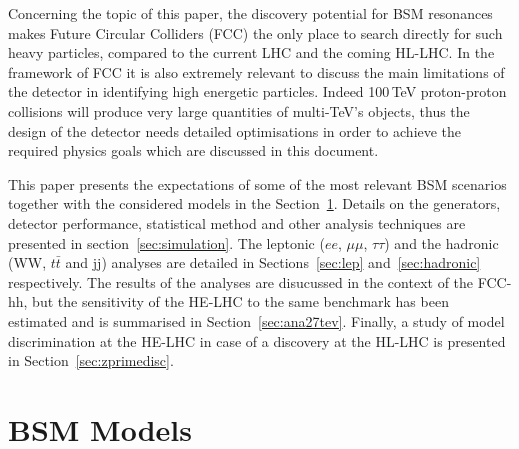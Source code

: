 \documentclass[a4paper,11pt]{article}
\begin{document}
Concerning the topic of this paper, the discovery potential for BSM resonances %
makes Future Circular Colliders (FCC) the only place to search directly for such heavy particles, compared to the current LHC and the coming HL-LHC.
In the framework of FCC it is also extremely relevant to discuss the main limitations of the detector in identifying high energetic particles. Indeed 100\,TeV proton-proton collisions will produce very large quantities of multi-TeV's objects, thus the design of the detector needs detailed optimisations in order to achieve the required physics goals which are discussed in this document.

This paper presents the expectations of some of the most relevant BSM scenarios together with the considered models in the Section~\ref{sec:bsmmodels}. Details on the generators, detector performance, statistical method and other analysis techniques are presented in section~\ref{sec:simulation}. The leptonic ($ee$, $\mu\mu$, $\tau\tau$) and the hadronic (WW, $t\bar{t}$ and jj) analyses are detailed in Sections~\ref{sec:lep} and~\ref{sec:hadronic} respectively. The results of the analyses are disucussed in the context of the FCC-hh, but the sensitivity of the HE-LHC to the same benchmark has been estimated and is summarised in Section~\ref{sec:ana27tev}. Finally, a study of \Zp model discrimination at the HE-LHC in case of a discovery at the HL-LHC is presented in Section~\ref{sec:zprimedisc}.

\section{BSM Models}
\label{sec:bsmmodels}
\end{document}

